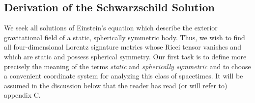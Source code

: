 
\subsection{Derivation of the Schwarzschild Solution}\label{sec:6.1}

We seek all solutions of Einstein's equation which describe the exterior
gravitational field of a static, spherically symmetric body. Thus, we wish to
find all four-dimensional Lorentz signature metrics whose Ricci tensor vanishes
and which are static and possess spherical symmetry. Our first task is to define
more precisely the meaning of the terms \emph{static} and \emph{spherically
symmetric} and to choose a convenient coordinate system for analyzing this class
of spacetimes. It will be assumed in the discussion below that the reader has
read (or will refer to) appendix C.

